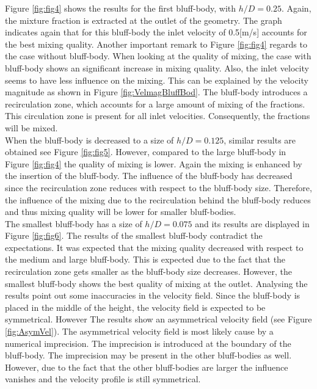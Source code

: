 \documentclass{CFD2017}
\begin{document}
Figure \ref{fig:fig4} shows the results for the first bluff-body, with $h/D=0.25 $. Again, the mixture fraction is extracted at the outlet of the geometry. The graph indicates again that for this bluff-body the inlet velocity  of 0.5[m/s] accounts for the best mixing quality. Another important remark to Figure \ref{fig:fig4} regards to the case without bluff-body. When looking at the quality of mixing, the case with bluff-body shows an significant increase in mixing quality. Also, the inlet velocity seems to have less influence on the mixing. This can be explained by the velocity magnitude as shown in Figure \ref{fig:VelmagBluffBod}. The bluff-body introduces a recirculation zone, which accounts for a large amount of mixing of the fractions. This circulation zone is present for all inlet velocities. Consequently, the fractions will be mixed.\\
When the bluff-body is decreased to a size of $h/D=0.125$, similar results are obtained see Figure \ref{fig:fig5}. However, compared to the large bluff-body in Figure \ref{fig:fig4} the quality of mixing is lower. Again the mixing is enhanced by the insertion of the bluff-body. The influence of the bluff-body has decreased since the recirculation zone reduces with respect to the bluff-body size. Therefore, the influence of the mixing due to the recirculation behind the bluff-body reduces and thus mixing quality will be lower for smaller bluff-bodies.\\
The smallest bluff-body has a size of $h/D=0.075$ and its results are displayed in Figure \ref{fig:fig6}. The results of the smallest bluff-body contradict the expectations. It was expected that the mixing quality decreased with respect to the medium and large bluff-body. This is expected due to the fact that the recirculation zone gets smaller as the bluff-body size decreases. However, the smallest bluff-body shows the best quality of mixing at the outlet. Analysing the results point out some inaccuracies in the velocity field. Since the bluff-body is placed in the middle of the height, the velocity field is expected to be symmetrical. However The results show an asymmetrical velocity field (see Figure \ref{fig:AsymVel}). The asymmetrical velocity field is most likely cause by a numerical imprecision. The imprecision is introduced at the boundary of the bluff-body. The imprecision may be present in the other bluff-bodies as well. However, due to the fact that the other bluff-bodies are larger the influence vanishes and the velocity profile is still symmetrical.\\
\end{document}
